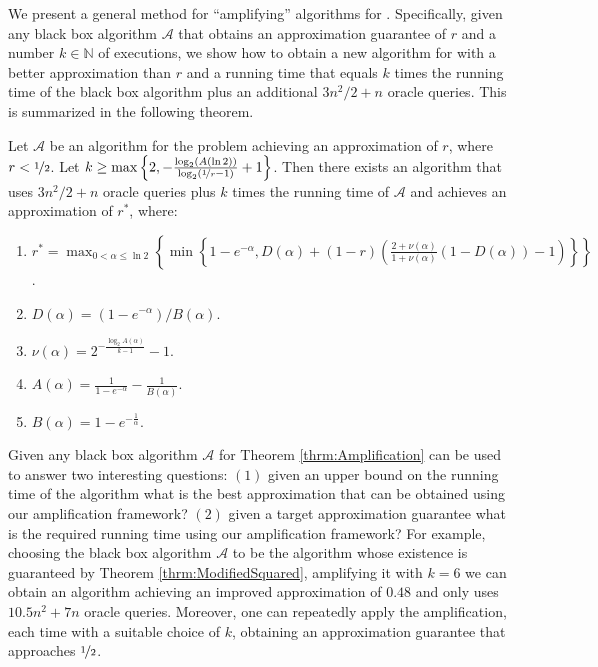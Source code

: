 \documentclass[a4paper]{article}
\begin{document}
 We present a general method for ``amplifying'' algorithms for \SK.
Specifically, given any black box algorithm $\mathcal{A}$ that obtains an approximation guarantee of $r$ and a number $k\in \mathbb{N}$ of executions, we show how to obtain a new algorithm for \SK with a better approximation than $r$ and a running time that equals $k$ times the running time of the black box algorithm plus an additional  $3n^2/2+n$ oracle queries.
This is summarized in the following theorem.
\begin{theorem}
	\label{thrm:Amplification}
Let $\mathcal{A}$ be an algorithm for the \SK problem achieving an approximation of $r$, where $r< \nicefrac[]{1}{2}$.
Let $k\geq \max \left\{2, -\frac{\log_2(A(\ln 2))}{\log_2(\nicefrac[]{1}{r} -1 ) }+1 \right\}$.
Then there exists an algorithm that uses $3n^2/2+n$ oracle queries plus $k$ times the running time of $\mathcal{A}$ and achieves an approximation of $r^*$, where:
\begin{enumerate}
\item $r^* = \max _{0< \alpha \leq \ln{2}} \left\{ \min \left\{ 1-e^{-\alpha},D(\alpha)+(1-r)\left( \frac{2+\nu(\alpha)}{1+\nu(\alpha)} (1-D(\alpha)) -1\right)\right\}\right\}$.
\item $ D(\alpha)=(1-e^{-\alpha})/B(\alpha)$.
\item $\nu(\alpha ) = 2^{-\frac{\log _2 {A(\alpha)}}{k-1}}-1$.
\item $ A(\alpha) = \frac{1}{1-e^{-\alpha}}-\frac{1}{B(\alpha)}$.
\item $ B(\alpha)=1-e^{-\frac{1}{\alpha}}$.
\end{enumerate}
\end{theorem}

Given any black box algorithm $\mathcal{A}$ for \SK Theorem \ref{thrm:Amplification} can be used to answer two interesting questions: $(1)$ given an upper bound on the running time of the algorithm what is the best approximation that can be obtained using our amplification framework? $(2)$ given a target approximation guarantee what is the required running time using our amplification framework?
For example, choosing the black box algorithm $\mathcal{A}$ to be the algorithm whose existence is guaranteed by Theorem \ref{thrm:ModifiedSquared}, amplifying it with $k=6$ we can obtain an algorithm achieving an improved approximation of $0.48$ and only uses  $10.5n^2+7n$ oracle queries.
Moreover, one can repeatedly apply the amplification, each time with a suitable choice of $k$, obtaining an approximation guarantee that approaches $\nicefrac[]{1}{2}$.
\end{document}
